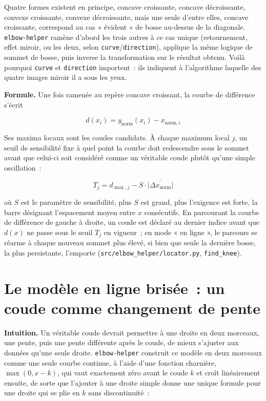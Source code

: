 \documentclass[11pt]{article}
\newcommand{\code}[1]{\texttt{#1}}
\begin{document}
Quatre formes existent en principe, concave croissante, concave
décroissante, convexe croissante, convexe décroissante, mais une seule
d'entre elles, concave croissante, correspond au cas « évident » de bosse
au-dessus de la diagonale. \code{elbow-helper} ramène d'abord les trois
autres à ce cas unique (retournement, effet miroir, ou les deux, selon
\code{curve}/\code{direction}), applique la même logique de sommet de
bosse, puis inverse la transformation sur le résultat obtenu. Voilà
pourquoi \code{curve} et \code{direction} importent~: ils indiquent à
l'algorithme laquelle des quatre images miroir il a sous les yeux.

\textbf{Formule.} Une fois ramenée au repère concave croissant, la courbe
de différence s'écrit

\begin{equation}
d(x_i) = y_{\text{norm}}(x_i) - x_{\text{norm}, i}
\end{equation}

Ses maxima locaux sont les coudes candidats. À chaque maximum local $j$, un
seuil de sensibilité fixe à quel point la courbe doit redescendre sous le
sommet avant que celui-ci soit considéré comme un véritable coude plutôt
qu'une simple oscillation~:

\begin{equation}
T_j = d_{\max, j} - S \cdot \overline{|\Delta x_{\text{norm}}|}
\end{equation}

où $S$ est le paramètre de sensibilité, plus $S$ est grand, plus l'exigence
est forte, la barre désignant l'espacement moyen entre $x$ consécutifs. En
parcourant la courbe de différence de gauche à droite, un coude est déclaré
au dernier indice avant que $d(x)$ ne passe sous le seuil $T_j$ en vigueur~;
en mode « en ligne », le parcours se réarme à chaque nouveau sommet plus
élevé, si bien que seule la dernière bosse, la plus persistante, l'emporte
(\code{src/elbow\_helper/locator.py}, \code{find\_knee}).

\section{Le modèle en ligne brisée~: un coude comme changement de pente}

\textbf{Intuition.} Un véritable coude devrait permettre à une droite en
deux morceaux, une pente, puis une pente différente après le coude, de
mieux s'ajuster aux données qu'une seule droite. \code{elbow-helper}
construit ce modèle en deux morceaux comme une seule courbe continue, à
l'aide d'une fonction charnière, $\max(0, x - k)$, qui vaut exactement zéro
avant le coude $k$ et croît linéairement ensuite, de sorte que l'ajouter à
une droite simple donne une unique formule pour une droite qui se plie en
$k$ sans discontinuité~:
\end{document}
